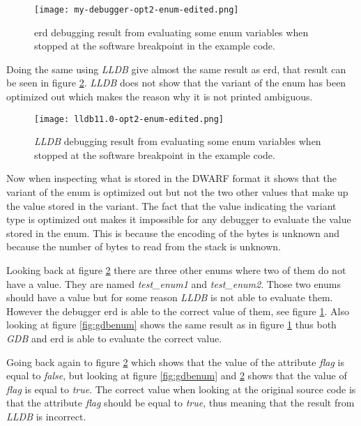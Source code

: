 \begin{figure}[h]
	\centering
	\texttt{[image: my-debugger-opt2-enum-edited.png]}
	\caption{\acrshort{erd} debugging result from evaluating some enum variables when stopped at the software breakpoint in the example code.}
	\label{fig:mydebuggerenum}
\end{figure}


Doing the same using \emph{LLDB} give almost the same result as \gls{erd}, that result can be seen in figure \ref{fig:lldbenum}.
\emph{LLDB} does not show that the variant of the enum has been optimized out which makes the reason why it is not printed ambiguous.


\begin{figure}[h]
	\centering
	\texttt{[image: lldb11.0-opt2-enum-edited.png]}
	\caption{\emph{LLDB} debugging result from evaluating some enum variables when stopped at the software breakpoint in the example code.}
	\label{fig:lldbenum}
\end{figure}


Now when inspecting what is stored in the \gls{DWARF} format it shows that the variant of the enum is optimized out but not the two other values that make up the value stored in the variant.
The fact that the value indicating the variant type is optimized out makes it impossible for any debugger to evaluate the value stored in the enum.
This is because the encoding of the bytes is unknown and because the number of bytes to read from the stack is unknown.


Looking back at figure \ref{fig:lldbenum} there are three other enums where two of them do not have a value.
They are named \emph{test\_enum1} and \emph{test\_enum2}.
Those two enums should have a value but for some reason \emph{LLDB} is not able to evaluate them.
However the debugger \gls{erd} is able to the correct value of them, see figure \ref{fig:mydebuggerenum}.
Also looking at figure \ref{fig:gdbenum} shows the same result as in figure \ref{fig:mydebuggerenum} thus both \emph{GDB} and \gls{erd} is able to evaluate the correct value.


Going back again to figure \ref{fig:lldbenum} which shows that the value of the attribute \emph{flag} is equal to \emph{false}, but looking at figure \ref{fig:gdbenum} and \ref{fig:lldbenum} shows that the value of \emph{flag} is equal to \emph{true}.
The correct value when looking at the original source code is that the attribute \emph{flag} should be equal to \emph{true}, thus meaning that the result from \emph{LLDB} is incorrect.



